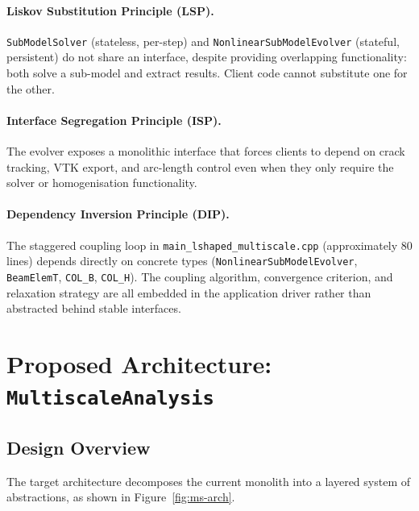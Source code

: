 \paragraph{Liskov Substitution Principle (LSP).}
\texttt{SubModelSolver} (stateless, per-step) and
\texttt{NonlinearSubModelEvolver} (stateful, persistent) do not
share an interface, despite providing overlapping functionality:
both solve a sub-model and extract results.  Client code cannot
substitute one for the other.

\paragraph{Interface Segregation Principle (ISP).}
The evolver exposes a monolithic interface that forces clients to
depend on crack tracking, VTK export, and arc-length control even
when they only require the solver or homogenisation functionality.

\paragraph{Dependency Inversion Principle (DIP).}
The staggered coupling loop in
\texttt{main\_lshaped\_multiscale.cpp} (approximately 80 lines)
depends directly on concrete types (\texttt{NonlinearSubModelEvolver},
\texttt{BeamElemT}, \texttt{COL\_B}, \texttt{COL\_H}).  The coupling
algorithm, convergence criterion, and relaxation strategy are all
embedded in the application driver rather than abstracted behind
stable interfaces.


\section{Proposed Architecture: \texttt{MultiscaleAnalysis}}
\label{sec:ms-proposed-arch}

\subsection{Design Overview}

The target architecture decomposes the current monolith into
a layered system of abstractions, as shown in
Figure~\ref{fig:ms-arch}.

